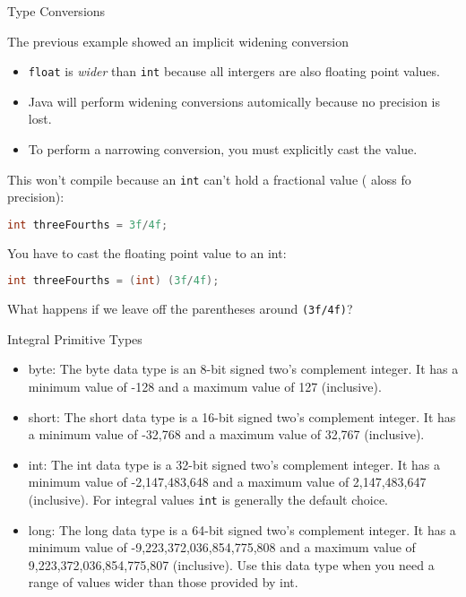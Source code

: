 \documentclass{beamer}
\begin{document}
\begin{frame}[fragile]{Type Conversions}


The previous example showed an implicit widening conversion
\begin{itemize}
\item {\tt float} is {\it wider} than {\tt int} because all intergers are also floating point values.
\item Java will perform widening conversions automically because no precision is lost.
\item To perform a narrowing conversion, you must explicitly cast the value.
\end{itemize}

This won't compile because an {\tt int} can't hold a fractional value ( aloss fo precision):
\begin{lstlisting}[language=Java]
int threeFourths = 3f/4f;
\end{lstlisting}

You have to cast the floating point value to an int:

\begin{lstlisting}[language=Java]
int threeFourths = (int) (3f/4f);
\end{lstlisting}

What happens if we leave off the parentheses around {\tt (3f/4f)}?


\end{frame}

\begin{frame}[fragile]{Integral Primitive Types}



\begin{itemize}
\item  byte: The byte data type is an 8-bit signed two's complement integer. It has a minimum value of -128 and a maximum value of 127 (inclusive).

\item short: The short data type is a 16-bit signed two's complement integer. It has a minimum value of -32,768 and a maximum value of 32,767 (inclusive). 

\item int: The int data type is a 32-bit signed two's complement integer. It has a minimum value of -2,147,483,648 and a maximum value of 2,147,483,647 (inclusive). For integral values {\tt int} is generally the default choice.

\item long: The long data type is a 64-bit signed two's complement integer. It has a minimum value of -9,223,372,036,854,775,808 and a maximum value of 9,223,372,036,854,775,807 (inclusive). Use this data type when you need a range of values wider than those provided by int.
\end{itemize}

\end{frame}
\end{document}
